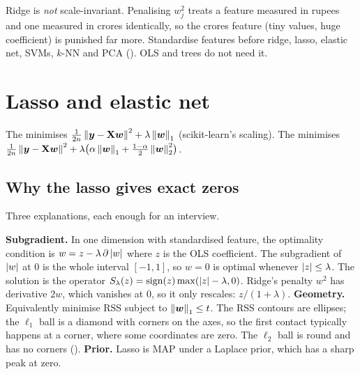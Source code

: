 \begin{remark}
	\trap Ridge is \emph{not} scale-invariant. Penalising $w_j^2$ treats a feature measured in
	rupees and one measured in crores identically, so the crores feature (tiny values, huge
	coefficient) is punished far more. Standardise features before ridge, lasso, elastic net, SVMs,
	$k$-NN and PCA (). OLS and trees do not need it.
\end{remark}

\section{Lasso and elastic net}

\begin{definition}
	The  minimises $\frac{1}{2n}\left\lVert {\bm{y}}-{\mathbf{X}}{\bm{w}} \right\rVert^2+\lambda\left\lVert {\bm{w}} \right\rVert_1$
	(scikit-learn's scaling). The  minimises
	$\frac{1}{2n}\left\lVert {\bm{y}}-{\mathbf{X}}{\bm{w}} \right\rVert^2+\lambda\bigl(\alpha\left\lVert {\bm{w}} \right\rVert_1+\frac{1-\alpha}{2}\left\lVert {\bm{w}} \right\rVert_2^2\bigr)$.
\end{definition}

\subsection{Why the lasso gives exact zeros}
Three explanations, each enough for an interview.
\begin{enumerate}
	\ii \textbf{Subgradient.} In one dimension with standardised feature, the optimality condition
	is $w=z-\lambda\,\partial\left\lvert w \right\rvert$ where $z$ is the OLS coefficient. The subgradient of $\left\lvert w \right\rvert$ at
	$0$ is the whole interval $[-1,1]$, so $w=0$ is optimal whenever $\left\lvert z \right\rvert\le\lambda$. The solution
	is the  operator $S_\lambda(z)=\operatorname{sign}(z)\max(\left\lvert z \right\rvert-\lambda,0)$. Ridge's
	penalty $w^2$ has derivative $2w$, which vanishes at $0$, so it only rescales: $z/(1+\lambda)$.
	\ii \textbf{Geometry.} Equivalently minimise RSS subject to $\left\lVert {\bm{w}} \right\rVert_1\le t$. The RSS
	contours are ellipses; the $\ell_1$ ball is a diamond with corners on the axes, so the first
	contact typically happens at a corner, where some coordinates are zero. The $\ell_2$ ball is
	round and has no corners ().
	\ii \textbf{Prior.} Lasso is MAP under a Laplace prior, which has a sharp peak at zero.
\end{enumerate}


